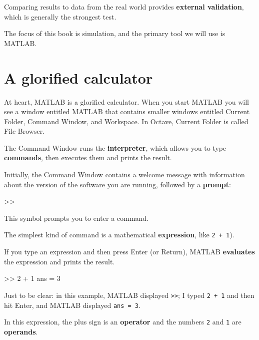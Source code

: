 \documentclass[main.tex]{subfiles}
\begin{document}

Comparing results to data from the real world provides {\bf external validation}, which is generally the strongest test.

The focus of this book is simulation, and the primary tool we will use is MATLAB.


\section{A glorified calculator}
\label{sect:calc}

At heart, MATLAB is a glorified calculator.  When you start MATLAB
you will see a window
entitled {\sf MATLAB} that contains smaller windows entitled {\sf
Current Folder}, {\sf Command Window}, and {\sf Workspace}.
In Octave, {\sf Current Folder} is called {\sf File Browser}.


The Command Window runs the {\bf interpreter}, which allows you
to type {\bf commands}, then executes them and prints the
result.


Initially, the Command Window contains a welcome message with information
about the version of the software you are running, followed by a {\bf prompt}:

\begin{code}
>>
\end{code}

This symbol prompts you to enter a command.

The simplest kind of command is a mathematical {\bf expression},
like {\tt 2 + 1}).


If you type an expression and then press Enter (or Return), MATLAB
{\bf evaluates} the expression and prints the result.

\begin{code}
>> 2 + 1
ans = 3
\end{code}

Just to be clear: in this example, MATLAB displayed {\tt >>}; I
typed {\tt 2 + 1} and then hit Enter, and MATLAB displayed {\tt ans = 3}.


In this expression, the plus sign is an {\bf operator} and the numbers {\tt 2} and {\tt 1} are {\bf operands}.
\end{document}
